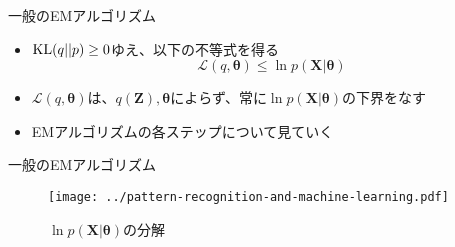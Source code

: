 \documentclass[dvipdfmx,notheorems,t]{beamer}
\begin{document}
\begin{frame}{一般のEMアルゴリズム}
\begin{itemize}
\begin{itemize}
		\item $\operatorname{KL} (q || p) \ge 0$ゆえ、以下の不等式を得る
		\begin{equation}
			\mathcal{L}(q, \bm{\theta}) \le \ln p(\bm{X} | \bm{\theta})
		\end{equation}
		
		\item $\mathcal{L}(q, \bm{\theta})$は、$q(\bm{Z}), \bm{\theta}$によらず、常に$\ln p(\bm{X} | \bm{\theta})$の\alert{下界}をなす
		\newline
		\item EMアルゴリズムの各ステップについて見ていく
	\end{itemize}
\end{itemize}

\end{frame}

\begin{frame}{一般のEMアルゴリズム}

\begin{figure}[h]
	\centering
	\texttt{[image: ../pattern-recognition-and-machine-learning.pdf]}
	\caption{$\ln p(\bm{X} | \bm{\theta})$の分解}
\end{figure}

\end{frame}
\end{document}
